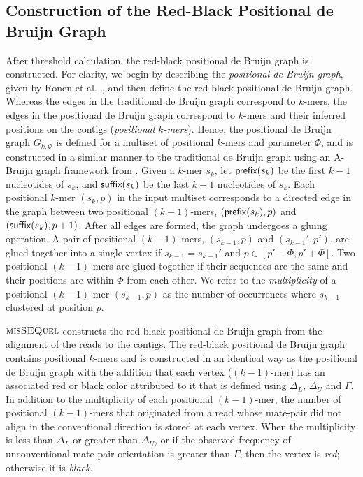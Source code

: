 \subsection{Construction of the Red-Black Positional de Bruijn Graph} 


After threshold calculation, the red-black positional de Bruijn graph is constructed. For clarity, we begin by describing the {\em positional de Bruijn graph}, given by Ronen et al.~\cite{sequel}, and then define the red-black positional de Bruijn graph.  Whereas the edges in the traditional de Bruijn graph correspond to $k$-mers, the edges in the positional de Bruijn graph correspond to $k$-mers and their inferred positions on the contigs ({\em positional $k$-mers}).  Hence, the positional de Bruijn graph $G_{k, \Phi}$ is defined for a multiset of positional $k$-mers and parameter $\Phi$, and is constructed in a similar manner to the traditional de Bruijn graph using an A-Bruijn graph framework from \cite{PTT04}. Given a $k$-mer $s_k$, let $\mbox{\rm {\sf prefix}}(s_k)$ be the first $k - 1$ nucleotides of $s_k$, and $\mbox{\rm {\sf suffix}}(s_k)$ be the last $k - 1$ nucleotides of $s_k$.  Each positional $k$-mer $(s_k, p)$ in the input multiset corresponds to a directed edge in the graph between two positional $(k - 1)$-mers, $(\mbox{\rm {\sf prefix}}(s_k), p)$ and $(\mbox{\rm {\sf suffix}}(s_k), p + 1)$.  After all edges are formed, the graph undergoes a gluing operation. A pair of positional $(k - 1)$-mers, $(s_{k - 1}, p)$ and $(s_{k - 1}', p')$, are glued together into a single vertex if $s_{k - 1} = s_{k - 1}'$ and $p \in [p' - \Phi, p' + \Phi]$.  Two positional $(k - 1)$-mers are glued together if their sequences are the same and their positions are within $\Phi$ from each other. We refer to the {\em multiplicity} of a positional $(k - 1)$-mer $(s_{k - 1}, p)$ as the number of occurrences where $s_{k - 1}$ clustered at position $p$.  

$\mbox{\rm {\sc misSEQuel}}$ constructs the red-black positional de Bruijn graph from the alignment of the reads to the contigs. The red-black positional de Bruijn graph contains positional $k$-mers and is constructed in an identical way as the positional de Bruijn graph with the addition that each vertex ($(k - 1)$-mer) has an associated red or black color attributed to it that is defined using $\Delta_L$, $\Delta_U$ and $\Gamma$.  In addition to the multiplicity of each positional $(k - 1)$-mer, the number of positional $(k - 1)$-mers that originated from a read whose mate-pair did not align in the conventional direction is stored at each vertex.   When the multiplicity is less than $\Delta_L$ or greater than $\Delta_U$, or if the observed frequency of unconventional mate-pair orientation is greater than $\Gamma$, then the vertex is {\em red}; otherwise it is {\em black}.

